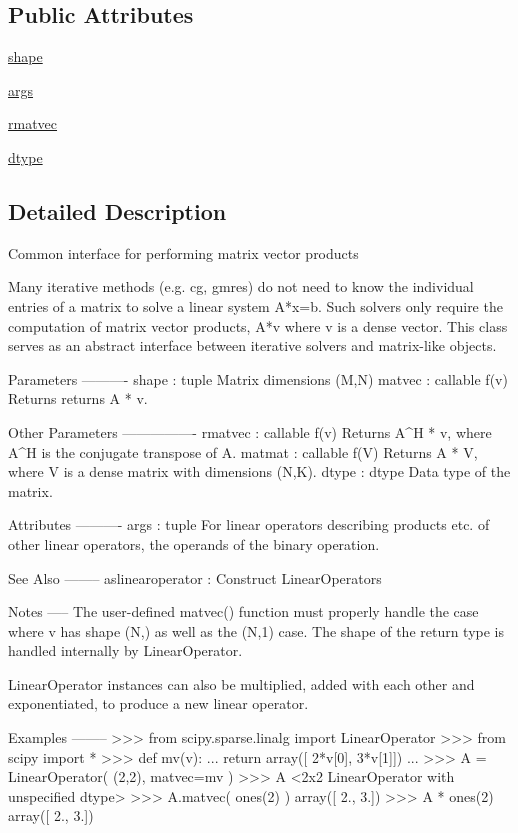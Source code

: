 \subsection*{Public Attributes}
\begin{DoxyCompactItemize}
\item 
\hyperlink{classscipy_1_1sparse_1_1linalg_1_1interface_1_1LinearOperator_a9a14fb365cf7b10d25aa5f234f4671fc}{shape}
\item 
\hyperlink{classscipy_1_1sparse_1_1linalg_1_1interface_1_1LinearOperator_af1bbc6d0bdf105a2067f61feb3f5af70}{args}
\item 
\hyperlink{classscipy_1_1sparse_1_1linalg_1_1interface_1_1LinearOperator_acf9788499397569ed3b5ab4656b9c62c}{rmatvec}
\item 
\hyperlink{classscipy_1_1sparse_1_1linalg_1_1interface_1_1LinearOperator_a790af3afc185130cde43f7998233d380}{dtype}
\end{DoxyCompactItemize}


\subsection{Detailed Description}
\begin{DoxyVerb}Common interface for performing matrix vector products

Many iterative methods (e.g. cg, gmres) do not need to know the
individual entries of a matrix to solve a linear system A*x=b.
Such solvers only require the computation of matrix vector
products, A*v where v is a dense vector.  This class serves as
an abstract interface between iterative solvers and matrix-like
objects.

Parameters
----------
shape : tuple
    Matrix dimensions (M,N)
matvec : callable f(v)
    Returns returns A * v.

Other Parameters
----------------
rmatvec : callable f(v)
    Returns A^H * v, where A^H is the conjugate transpose of A.
matmat : callable f(V)
    Returns A * V, where V is a dense matrix with dimensions (N,K).
dtype : dtype
    Data type of the matrix.

Attributes
----------
args : tuple
    For linear operators describing products etc. of other linear
    operators, the operands of the binary operation.

See Also
--------
aslinearoperator : Construct LinearOperators

Notes
-----
The user-defined matvec() function must properly handle the case
where v has shape (N,) as well as the (N,1) case.  The shape of
the return type is handled internally by LinearOperator.

LinearOperator instances can also be multiplied, added with each
other and exponentiated, to produce a new linear operator.

Examples
--------
>>> from scipy.sparse.linalg import LinearOperator
>>> from scipy import *
>>> def mv(v):
...     return array([ 2*v[0], 3*v[1]])
...
>>> A = LinearOperator( (2,2), matvec=mv )
>>> A
<2x2 LinearOperator with unspecified dtype>
>>> A.matvec( ones(2) )
array([ 2.,  3.])
>>> A * ones(2)
array([ 2.,  3.])\end{DoxyVerb}
 


